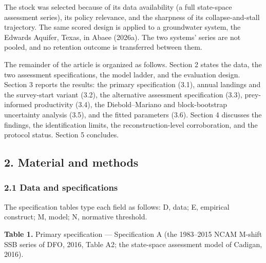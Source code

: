 \documentclass[11pt]{article}
\begin{document}
The stock was selected because of its data availability (a full
state-space assessment series), its policy relevance, and the sharpness
of its collapse-and-stall trajectory. The same scored design is applied to a groundwater system, the Edwards
Aquifer, Texas, in Abaee (2026a). The two systems' series are not
pooled, and no retention outcome is transferred between them.

The remainder of the article is organized as follows. Section 2 states
the data, the two assessment specifications, the model ladder, and the
evaluation design. Section 3 reports the results: the primary
specification (3.1), annual landings and the survey-start variant (3.2),
the alternative assessment specification (3.3), prey-informed
productivity (3.4), the Diebold--Mariano and block-bootstrap
uncertainty analysis (3.5), and the fitted parameters (3.6).
Section 4 discusses the findings, the identification limits, the
reconstruction-level corroboration, and the protocol status.
Section 5 concludes.

\subsection{2. Material and methods}\label{material-and-methods}

\subsubsection{2.1 Data and
specifications}\label{data-and-specifications}

The specification tables type each field as follows: D, data; E,
empirical construct; M, model; N, normative threshold.

\textbf{Table 1.} Primary specification --- Specification A (the
1983--2015 NCAM M-shift SSB series of DFO, 2016, Table A2; the
state-space assessment model of Cadigan, 2016).
\end{document}
